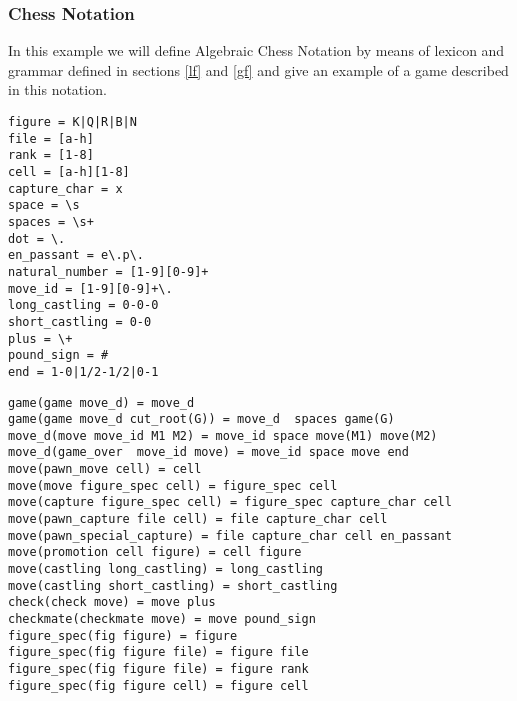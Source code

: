 \documentclass[a4paper,10pt]{article}
\newcounter{subsubsubsection}[subsubsection]
\begin{document}
\subsubsection{Chess Notation}
In this example we will define Algebraic Chess Notation \cite{chess} by means of lexicon and grammar defined in sections \ref{lf} and \ref{gf} and give an example of a game described in this notation. 
\label{clex}
\begin{verbatim}
figure = K|Q|R|B|N
file = [a-h]
rank = [1-8]
cell = [a-h][1-8]
capture_char = x
space = \s
spaces = \s+
dot = \.
en_passant = e\.p\.
natural_number = [1-9][0-9]+
move_id = [1-9][0-9]+\.
long_castling = 0-0-0
short_castling = 0-0
plus = \+
pound_sign = #
end = 1-0|1/2-1/2|0-1
\end{verbatim}
\label{cgram}
\begin{verbatim}
game(game move_d) = move_d 
game(game move_d cut_root(G)) = move_d  spaces game(G)
move_d(move move_id M1 M2) = move_id space move(M1) move(M2)
move_d(game_over  move_id move) = move_id space move end
move(pawn_move cell) = cell
move(move figure_spec cell) = figure_spec cell
move(capture figure_spec cell) = figure_spec capture_char cell
move(pawn_capture file cell) = file capture_char cell
move(pawn_special_capture) = file capture_char cell en_passant
move(promotion cell figure) = cell figure
move(castling long_castling) = long_castling
move(castling short_castling) = short_castling
check(check move) = move plus
checkmate(checkmate move) = move pound_sign
figure_spec(fig figure) = figure
figure_spec(fig figure file) = figure file
figure_spec(fig figure file) = figure rank
figure_spec(fig figure cell) = figure cell
\end{verbatim}

\label{csf}
\begin{comment}
\begin{verbatim}

1. e4 c5 2. Nf3 d6 3. Bb5 Bd7 4. Bxd7 Qxd7 5. c4 Nc6 6. Nc3 Nf6 
7. 0-0 g6 8. d4 cxd4 9. Nxd4 Bg7 10. Nde2 Qe6  11. Nd5 Qxe4 
12. Nc7+ Kd7 13. Nxa8 Qxc4 14. Nb6+ axb6 15. Nc3 Ra8 16. a4 Ne4 
17. Nxe4 Qxe4 18. Qb3 f5 19. Bg5 Qb4 20. Qf7 Be5 21. h3 Rxa4 
22. Rxa4 Qxa4 23. Qxh7 Bxb2 24. Qxg6 Qe4 25. Qf7 Bd4 26. Qb3 f4 
27. Qf7 Be5 28. h4 b5 29. h5 Qc4 30. Qf5+ Qe6 31. Qxe6+ Kxe6 
32. g3 fxg3 33. fxg3 b4 34. Bf4 Bd4 
35. Kh1! b3 36. g4 Kd5 37. g5 e6 38. h6 Ne7 39. Rd1 e5 40. Be3 Kc4 
41. Bxd4 exd4 42. Kg2 b2 43. Kf3 Kc3 44. h7 Ng6 45. Ke4 Kc2 
46. Rh1 d3 47. Kf5 b1=Q 48. Rxb1 Kxb1 49. Kxg6 d2 50. h8=Q d1=Q 
51. Qh7 b5 52. Kf6 Kb2 53. Qh2 Ka1 54. Qf4 b4 55. Qxb4 Qf3+ 
56. Kg7 d5 57. Qd4 Kb1 58. g6 Qe4 59. Qg1 Kb2 60. Qf2+ Kc1 
61. Kf6 d4 62. g7 1-0 
\end{verbatim}
\end{comment}
\end{document}
